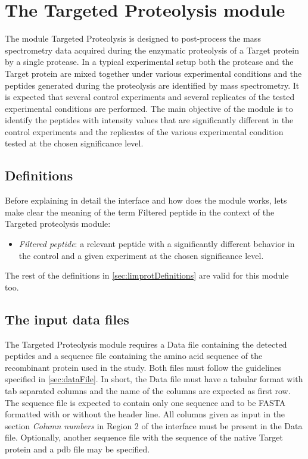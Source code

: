 \chapter{The Targeted Proteolysis module}
\label{chap:tarprot}

The module Targeted Proteolysis is designed to post-process the mass spectrometry data acquired during the enzymatic proteolysis of a Target protein by a single protease. In a typical experimental setup both the protease and the Target protein are mixed together under various experimental conditions and the peptides generated during the proteolysis are identified by mass spectrometry. It is expected that several control experiments and several replicates of the tested experimental conditions are performed. The main objective of the module is to identify the peptides with intensity values that are significantly different in the control experiments and the replicates of the various experimental condition tested at the chosen significance level. 

\section{Definitions}

Before explaining in detail the interface and how does the module works, lets make clear the meaning of the term Filtered peptide in the context of the Targeted proteolysis module:

\begin{itemize}
	\item \textit{Filtered peptide}: a relevant peptide with a significantly different behavior in the control and a given experiment at the chosen significance level.\label{par:tarprotPIP}
\end{itemize}

The rest of the definitions in \autoref{sec:limprotDefinitions} are valid for this module too.

\section{The input data files}

The Targeted Proteolysis module requires a Data file containing the detected peptides and a sequence file containing the amino acid sequence of the recombinant protein used in the study. Both files must follow the guidelines specified in \autoref{sec:dataFile}. In short, the Data file must have a tabular format with tab separated columns and the name of the columns are expected as first row. The sequence file is expected to contain only one sequence and to be FASTA formatted with or without the header line. All columns given as input in the section \textit{Column numbers} in Region \num{2} of the interface must be present in the Data file. Optionally, another sequence file with the sequence of the native Target protein and a pdb file may be specified.

